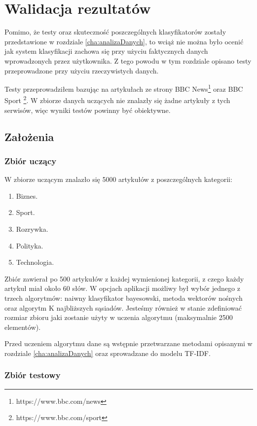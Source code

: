 \chapter{Walidacja rezultatów}
\label{cha:walidacja}

Pomimo, że testy oraz skuteczność poszczególnych klasyfikatorów zostały przedstawione w rozdziale \ref{cha:analizaDanych}, to wciąż nie można było ocenić jak system klasyfikacji zachowa się przy użyciu faktycznych danych wprowadzonych przez użytkownika. Z tego powodu w tym rozdziale opisano testy przeprowadzone przy użyciu rzeczywistych danych.

Testy przeprowadziłem bazując na artykułach ze strony BBC News\footnote{https://www.bbc.com/news} oraz BBC Sport \footnote{https://www.bbc.com/sport}. W zbiorze danych uczących nie znalazły się żadne artykuły z tych serwisów, więc wyniki testów powinny być obiektywne.

\section{Założenia}

\subsection{Zbiór uczący}

W zbiorze uczącym znalazło się 5000 artykułów z poszczególnych kategorii:

\begin{enumerate}
    \item Biznes.
    \item Sport.
    \item Rozrywka.
    \item Polityka.
    \item Technologia.
\end{enumerate}

Zbiór zawierał po 500 artykułów z każdej wymienionej kategorii, z czego każdy artykuł miał około 60 słów. W opcjach aplikacji możliwy był wybór jednego z trzech algorytmów: naiwny klasyfikator bayesowski, metoda wektorów nośnych oraz algorytm K najbliższych sąsiadów. Jesteśmy również w stanie zdefiniować rozmiar zbioru jaki zostanie użyty w uczenia algorytmu (maksymalnie 2500 elementów).

Przed uczeniem algorytmu dane są wstępnie przetwarzane metodami opisanymi w rozdziale \ref{cha:analizaDanych} oraz sprowadzane do modelu TF-IDF.

\subsection{Zbiór testowy}

